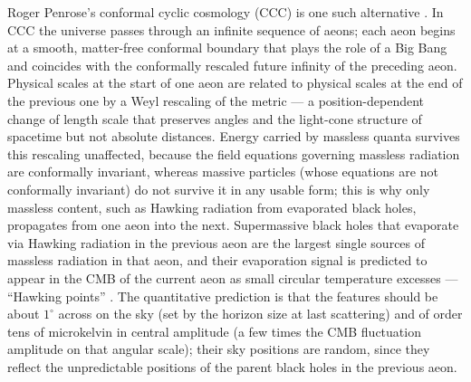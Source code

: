 \documentclass[fleqn,usenatbib]{mnras}
\begin{document}
Roger Penrose's conformal cyclic cosmology (CCC) is one such alternative \citep{penrose_ccc_2010}. In CCC the universe passes through an infinite sequence of aeons; each aeon begins at a smooth, matter-free conformal boundary that plays the role of a Big Bang and coincides with the conformally rescaled future infinity of the preceding aeon. Physical scales at the start of one aeon are related to physical scales at the end of the previous one by a Weyl rescaling of the metric --- a position-dependent change of length scale that preserves angles and the light-cone structure of spacetime but not absolute distances. Energy carried by massless quanta survives this rescaling unaffected, because the field equations governing massless radiation are conformally invariant, whereas massive particles (whose equations are not conformally invariant) do not survive it in any usable form; this is why only massless content, such as Hawking radiation from evaporated black holes, propagates from one aeon into the next. Supermassive black holes that evaporate via Hawking radiation \citep{hawking_1975} in the previous aeon are the largest single sources of massless radiation in that aeon, and their evaporation signal is predicted to appear in the CMB of the current aeon as small circular temperature excesses --- ``Hawking points'' \citep{an_amnp_2018}. The quantitative prediction is that the features should be about $1^\circ$ across on the sky (set by the horizon size at last scattering) and of order tens of microkelvin in central amplitude (a few times the CMB fluctuation amplitude on that angular scale); their sky positions are random, since they reflect the unpredictable positions of the parent black holes in the previous aeon.
\end{document}
